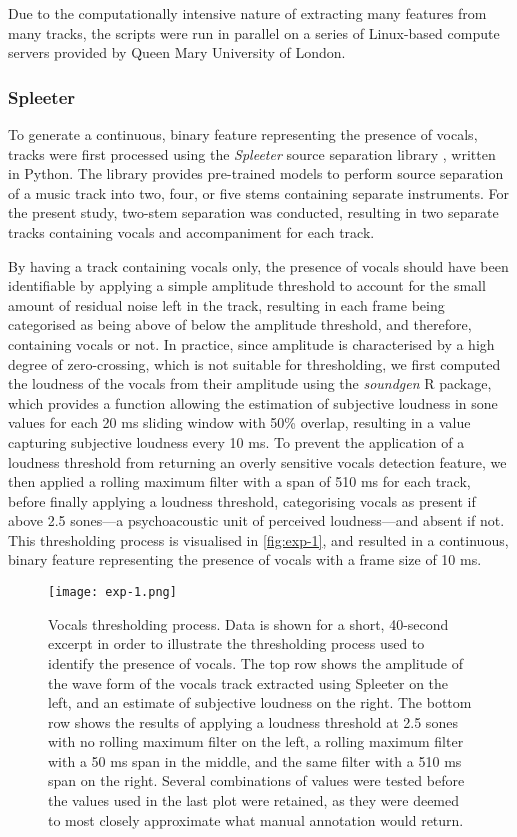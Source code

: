 Due to the computationally intensive nature of extracting many features from many tracks, the scripts were run in parallel on a series of Linux-based compute servers provided by Queen Mary University of London.

\subsubsection{Spleeter}

To generate a continuous, binary feature representing the presence of vocals, tracks were first processed using the \emph{Spleeter} source separation library \parencite{hennequin2020}, written in Python. The library provides pre-trained models to perform source separation of a music track into two, four, or five stems containing separate instruments. For the present study, two-stem separation was conducted, resulting in two separate tracks containing vocals and accompaniment for each track.

By having a track containing vocals only, the presence of vocals should have been identifiable by applying a simple amplitude threshold to account for the small amount of residual noise left in the track, resulting in each frame being categorised as being above of below the amplitude threshold, and therefore, containing vocals or not. In practice, since amplitude is characterised by a high degree of zero-crossing, which is not suitable for thresholding, we first computed the loudness of the vocals from their amplitude using the \emph{soundgen} R package, which provides a function allowing the estimation of subjective loudness in sone values for each 20 ms sliding window with 50\% overlap, resulting in a value capturing subjective loudness every 10 ms. To prevent the application of a loudness threshold from returning an overly sensitive vocals detection feature, we then applied a rolling maximum filter with a span of 510 ms for each track, before finally applying a loudness threshold, categorising vocals as present if above 2.5 sones---a psychoacoustic unit of perceived loudness---and absent if not. This thresholding process is visualised in \autoref{fig:exp-1}, and resulted in a continuous, binary feature representing the presence of vocals with a frame size of 10 ms.

\begin{figure}[t!]
\texttt{[image: exp-1.png]}
\centering
\caption{Vocals thresholding process. Data is shown for a short, 40-second excerpt in order to illustrate the thresholding process used to identify the presence of vocals. The top row shows the amplitude of the wave form of the vocals track extracted using Spleeter on the left, and an estimate of subjective loudness on the right. The bottom row shows the results of applying a loudness threshold at 2.5 sones with no rolling maximum filter on the left, a rolling maximum filter with a 50 ms span in the middle, and the same filter with a 510 ms span on the right. Several combinations of values were tested before the values used in the last plot were retained, as they were deemed to most closely approximate what manual annotation would return.}
\label{fig:exp-1}
\end{figure}

